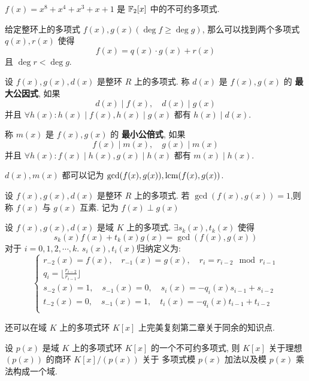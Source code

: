\begin{example}
    \(f(x) = x^8 + x^4 + x^3 + x + 1\) 是 \(\mathbb{F}_2[x]\) 中的不可约多项式.
\end{example}

\begin{definition}[多项式的Euclid除法]
    给定整环上的多项式 \(f(x),g(x) (\deg f \ge \deg g)\),
    那么可以找到两个多项式 \(q(x), r(x)\) 使得
    \[f(x) = q(x) \cdot g(x) + r(x)\]
    且 \(\deg r < \deg g\).
\end{definition}

\begin{definition}
    设 \(f(x),g(x),d(x)\) 是整环 \(R\) 上的多项式. 称 \(d(x)\) 是
    \(f(x),g(x)\) 的 \textbf{最大公因式}, 如果
    \[d(x) \mid f(x), \quad d(x) \mid g(x)\]
    并且 \(\forall h(x) : h(x) \mid f(x), h(x) \mid g(x)\) 都有 \(h(x) \mid d(x)\).

    称 \(m(x)\) 是 \(f(x),g(x)\) 的 \textbf{最小公倍式}, 如果
    \[f(x) \mid m(x), \quad g(x) \mid m(x)\]
    并且 \(\forall h(x) : f(x) \mid h(x), g(x) \mid h(x)\) 都有 \(m(x) \mid h(x)\).

    \(d(x),m(x)\) 都可以记为 \(\gcd(f(x),g(x)),\mathrm{lcm}(f(x),g(x))\).
\end{definition}

\begin{definition}[多项式互素]
    设 \(f(x),g(x),d(x)\) 是整环 \(R\) 上的多项式.
    若 \(\gcd(f(x), g(x)) = 1\),则称 \(f(x)\) 与 \(g(x)\) 互素.
    记为 \(f(x) \perp g(x)\)
\end{definition}

\begin{theorem}[多项式广义Euclid除法]
    设 \(f(x),g(x),d(x)\) 是域 \(K\) 上的多项式.
    \(\exists s_k(x),t_k(x)\) 使得
    \[s_k(x)f(x) + t_k(x)g(x) = \gcd(f(x),g(x))\]
    对于 \(i = 0,1,2,\cdots,k\). \(s_i(x),t_i(x)\)归纳定义为:
    \[\begin{cases}
        r_{-2}(x) = f(x),\quad r_{-1}(x) = g(x),\quad r_{i} = r_{i-2} \mod{r_{i-1}} \\
        q_{i} = \lfloor \frac{r_{i-2}}{r_{i-1}} \rfloor \\
        s_{-2}(x) = 1,\quad s_{-1}(x) = 0,\quad s_{i}(x) = -q_i(x) s_{i-1}+s_{i-2} \\
        t_{-2}(x) = 0,\quad s_{-1}(x) = 1,\quad t_{i}(x) = -q_i(x) t_{i-1}+t_{i-2} \\
    \end{cases}\]
\end{theorem}

还可以在域 \(K\) 上的多项式环 \(K[x]\) 上完美复刻第二章关于同余的知识点.

\begin{definition}[多项式环的商环]
    
\end{definition}

\begin{theorem}
    设 \(p(x)\) 是域 \(K\) 上的多项式环 \(K[x]\) 的一个不可约多项式, 
    则 \(K[x]\) 关于理想 \((p(x))\) 的商环 \(K[x]/(p(x))\) 关于
    多项式模 \(p(x)\) 加法以及模 \(p(x)\) 乘法构成一个域.
\end{theorem}
    